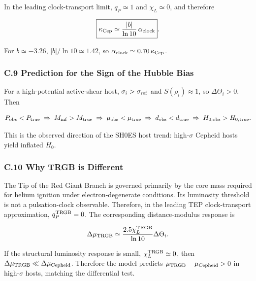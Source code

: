 \documentclass[
]{article}
\begin{document}
In the leading clock-transport limit, \(q_P \simeq 1\) and
\(\chi_L \simeq 0\), and therefore

\begin{equation}
\boxed{\kappa_{\rm Cep} \simeq \frac{|b|}{\ln 10}\,\alpha_{\rm clock}} .
\end{equation}

For \(b \simeq -3.26\), \(|b|/\ln 10 \simeq 1.42\), so
\(\alpha_{\rm clock} \simeq 0.70\,\kappa_{\rm Cep}\).

\subsubsection{C.9 Prediction for the Sign of the Hubble
Bias}\label{c.9-prediction-for-the-sign-of-the-hubble-bias}

For a high-potential active-shear host, \(\sigma_i > \sigma_{\rm ref}\)
and \(S(\rho_i) \approx 1\), so \(\Delta\Theta_i > 0\). Then

\begin{equation}
P_{\rm obs} < P_{\rm true} \;\Rightarrow\; M_{\rm inf} > M_{\rm true} \;\Rightarrow\; \mu_{\rm obs} < \mu_{\rm true} \;\Rightarrow\; d_{\rm obs} < d_{\rm true} \;\Rightarrow\; H_{0,\rm obs} > H_{0,\rm true} .
\end{equation}

This is the observed direction of the SH0ES host trend: high-\(\sigma\)
Cepheid hosts yield inflated \(H_0\).

\subsubsection{C.10 Why TRGB is
Different}\label{c.10-why-trgb-is-different}

The Tip of the Red Giant Branch is governed primarily by the core mass
required for helium ignition under electron-degenerate conditions. Its
luminosity threshold is not a pulsation-clock observable. Therefore, in
the leading TEP clock-transport approximation, \(q_P^{\rm TRGB} = 0\).
The corresponding distance-modulus response is

\begin{equation}
\Delta\mu_{\rm TRGB} \simeq \frac{2.5\chi_L^{\rm TRGB}}{\ln 10}\Delta\Theta_i .
\end{equation}

If the structural luminosity response is small,
\(\chi_L^{\rm TRGB} \simeq 0\), then
\(\Delta\mu_{\rm TRGB} \ll \Delta\mu_{\rm Cepheid}\). Therefore the
model predicts \(\mu_{\rm TRGB} - \mu_{\rm Cepheid} > 0\) in
high-\(\sigma\) hosts, matching the differential test.
\end{document}
